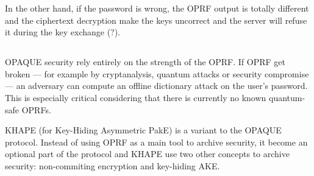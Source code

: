 \documentclass[../report.tex]{subfiles}
\begin{document}
In the other hand, if the password is wrong, the OPRF output is totally different and the ciphertext decryption make the keys uncorrect and the server will refuse it during the key exchange (?). %






\subsection{}
\paragraph{}

OPAQUE security rely entirely on the strength of the OPRF. If OPRF get broken --- for example by cryptanalysis, quantum attacks or security compromise --- an adversary can compute an offline dictionary attack on the user's password. This is especially critical considering that there is currently no known quantum-safe OPRFs.

KHAPE (for Key-Hiding Asymmetric PakE) \cite{KHAPE_Paper} is a variant to the OPAQUE protocol. Instead of using OPRF as a main tool to archive security, it become an optional part of the protocol and KHAPE use two other concepts to archive security: non-commiting encryption and key-hiding AKE. %



\end{document}

